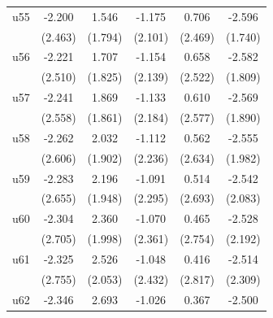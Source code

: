 \begin{table}[htbp]
\begin{tabular}{l*{5}{c}}
\addlinespace
u55                 &      -2.200         &       1.546         &      -1.175         &       0.706         &      -2.596         \\
                    &     (2.463)         &     (1.794)         &     (2.101)         &     (2.469)         &     (1.740)         \\
\addlinespace
u56                 &      -2.221         &       1.707         &      -1.154         &       0.658         &      -2.582         \\
                    &     (2.510)         &     (1.825)         &     (2.139)         &     (2.522)         &     (1.809)         \\
\addlinespace
u57                 &      -2.241         &       1.869         &      -1.133         &       0.610         &      -2.569         \\
                    &     (2.558)         &     (1.861)         &     (2.184)         &     (2.577)         &     (1.890)         \\
\addlinespace
u58                 &      -2.262         &       2.032         &      -1.112         &       0.562         &      -2.555         \\
                    &     (2.606)         &     (1.902)         &     (2.236)         &     (2.634)         &     (1.982)         \\
\addlinespace
u59                 &      -2.283         &       2.196         &      -1.091         &       0.514         &      -2.542         \\
                    &     (2.655)         &     (1.948)         &     (2.295)         &     (2.693)         &     (2.083)         \\
\addlinespace
u60                 &      -2.304         &       2.360         &      -1.070         &       0.465         &      -2.528         \\
                    &     (2.705)         &     (1.998)         &     (2.361)         &     (2.754)         &     (2.192)         \\
\addlinespace
u61                 &      -2.325         &       2.526         &      -1.048         &       0.416         &      -2.514         \\
                    &     (2.755)         &     (2.053)         &     (2.432)         &     (2.817)         &     (2.309)         \\
\addlinespace
u62                 &      -2.346         &       2.693         &      -1.026         &       0.367         &      -2.500         \\

\end{tabular}
\end{table}
